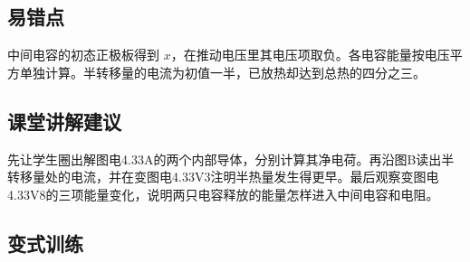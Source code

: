 \documentclass[UTF8,fontset=fandol,a4paper,11pt]{ctexart}
\begin{document}
\subsection*{易错点}

中间电容的初态正极板得到 $x$，在推动电压里其电压项取负。各电容能量按电压平方单独计算。半转移量的电流为初值一半，已放热却达到总热的四分之三。



\subsection*{课堂讲解建议}

先让学生圈出解图电4.33A的两个内部导体，分别计算其净电荷。再沿图B读出半转移量处的电流，并在变图电4.33V3注明半热量发生得更早。最后观察变图电4.33V8的三项能量变化，说明两只电容释放的能量怎样进入中间电容和电阻。


\subsection*{变式训练}
\end{document}
